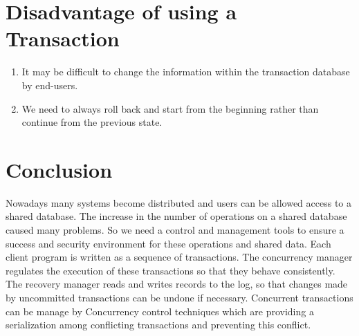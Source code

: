 \documentclass{article}
\begin{document}
\section*{Disadvantage of using a Transaction} 

\begin{enumerate}

\item It may be difficult to change the information within the transaction database by end-users.
\item We need to always roll back and start from the beginning rather than continue from the previous state.

\end{enumerate}

\section*{Conclusion}


Nowadays many systems become distributed and users can be allowed access to a shared database. The increase in the number of operations on a shared database caused many problems. So we need a control and management tools to ensure a success and security environment for these operations and shared data. Each client program is written as a sequence of transactions. The concurrency manager regulates the execution of these transactions so that they behave consistently. The recovery manager reads and writes records to the log, so that changes made by uncommitted transactions can be undone if necessary. Concurrent transactions can be manage by Concurrency control 
techniques which are providing a serialization among conflicting 
transactions and preventing this conflict.
\end{document}
